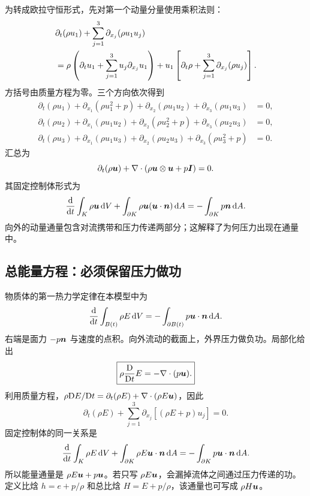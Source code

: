 为转成欧拉守恒形式，先对第一个动量分量使用乘积法则：
\begin{align}
 &\partial_t(\rho u_1)+\sum_{j=1}^3\partial_{x_j}(\rho u_1u_j)\notag\\
 &=\rho\left(\partial_tu_1+\sum_{j=1}^3u_j\partial_{x_j}u_1\right)
 +u_1\left[\partial_t\rho+\sum_{j=1}^3\partial_{x_j}(\rho u_j)\right].
\end{align}
方括号由质量方程为零。三个方向依次得到
\begin{align}
 \partial_t(\rho u_1)+\partial_{x_1}(\rho u_1^2+p)
 +\partial_{x_2}(\rho u_1u_2)+\partial_{x_3}(\rho u_1u_3)&=0,\\
 \partial_t(\rho u_2)+\partial_{x_1}(\rho u_1u_2)
 +\partial_{x_2}(\rho u_2^2+p)+\partial_{x_3}(\rho u_2u_3)&=0,\\
 \partial_t(\rho u_3)+\partial_{x_1}(\rho u_1u_3)
 +\partial_{x_2}(\rho u_2u_3)+\partial_{x_3}(\rho u_3^2+p)&=0.
\end{align}
汇总为
\begin{equation}
 \partial_t(\rho\bm{u})+\nabla\cdot(\rho\bm{u}\otimes\bm{u}+p\bm{I})=0.
 \label{eq:euler-momentum-detail}
\end{equation}
其固定控制体形式为
\begin{equation}
 \frac{\mathrm d}{\mathrm dt}\int_K\rho\bm{u}\,\mathrm d V
 +\int_{\partial K}\rho\bm{u}(\bm{u}\cdot\bm{n})\,\mathrm d A
 =-\int_{\partial K}p\bm{n}\,\mathrm d A.
 \label{eq:euler-momentum-integral}
\end{equation}
向外的动量通量包含对流携带和压力传递两部分；这解释了为何压力出现在通量中。

\subsection{总能量方程：必须保留压力做功}

物质体的第一热力学定律在本模型中为
\begin{equation}
 \frac{\mathrm d}{\mathrm dt}\int_{B(t)}\rho E\,\mathrm d V
 =-\int_{\partial B(t)}p\bm{u}\cdot\bm{n}\,\mathrm d A.
\end{equation}
右端是面力 $-p\bm{n}$ 与速度的点积。向外流动的截面上，外界压力做负功。局部化给出
\begin{equation}
 \boxed{\rho\frac{\mathrm D}{\mathrm Dt} E=-\nabla\cdot(p\bm{u}).}\label{eq:euler-total-material}
\end{equation}
利用质量方程，$\rho\mathrm DE/\mathrm Dt=\partial_t(\rho E)+\nabla\cdot(\rho E\bm{u})$，因此
\begin{equation}
 \boxed{\partial_t(\rho E)+\sum_{j=1}^3\partial_{x_j}[(\rho E+p)u_j]=0.}
 \label{eq:euler-energy-detail}
\end{equation}
固定控制体的同一关系是
\begin{equation}
 \frac{\mathrm d}{\mathrm dt}\int_K\rho E\,\mathrm d V
 +\int_{\partial K}\rho E\bm{u}\cdot\bm{n}\,\mathrm d A
 =-\int_{\partial K}p\bm{u}\cdot\bm{n}\,\mathrm d A.
 \label{eq:euler-energy-integral}
\end{equation}
所以能量通量是 $\rho E\bm{u}+p\bm{u}$。若只写 $\rho E\bm{u}$，会漏掉流体之间通过压力传递的功。定义比焓 $h=e+p/\rho$ 和总比焓 $H=E+p/\rho$，该通量也可写成 $\rho H\bm{u}$。

